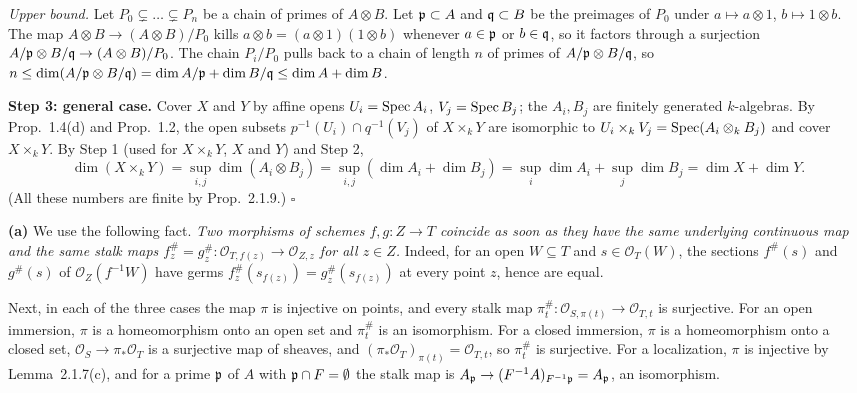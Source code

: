 \documentclass[11pt]{article}
\begin{document}
\emph{Upper bound.} Let $P_0\subsetneq\dots\subsetneq P_n$ be a chain of primes of $A\otimes B$. Let $\mathfrak p\subset A$ and $\mathfrak q\subset B$ be the preimages of $P_0$ under $a\mapsto a\otimes1$, $b\mapsto1\otimes b$. The map $A\otimes B\to(A\otimes B)/P_0$ kills $a\otimes b=(a\otimes1)(1\otimes b)$ whenever $a\in\mathfrak p$ or $b\in\mathfrak q$, so it factors through a surjection $A/\mathfrak p\otimes B/\mathfrak q\to(A\otimes B)/P_0$. The chain $P_i/P_0$ pulls back to a chain of length $n$ of primes of $A/\mathfrak p\otimes B/\mathfrak q$, so $n\le\dim(A/\mathfrak p\otimes B/\mathfrak q)=\dim A/\mathfrak p+\dim B/\mathfrak q\le\dim A+\dim B$.

\textbf{Step 3: general case.} Cover $X$ and $Y$ by affine opens $U_i=\operatorname{Spec} A_i$, $V_j=\operatorname{Spec} B_j$; the $A_i,B_j$ are finitely generated $k$-algebras. By Prop.~1.4(d) and Prop.~1.2, the open subsets $p^{-1}(U_i)\cap q^{-1}(V_j)$ of $X\times_kY$ are isomorphic to $U_i\times_kV_j=\operatorname{Spec}(A_i\otimes_kB_j)$ and cover $X\times_kY$. By Step 1 (used for $X\times_k Y$, $X$ and $Y$) and Step 2,
\[ \dim(X\times_kY)=\sup_{i,j}\dim(A_i\otimes B_j)=\sup_{i,j}(\dim A_i+\dim B_j)=\sup_i\dim A_i+\sup_j\dim B_j=\dim X+\dim Y. \]
(All these numbers are finite by Prop.~2.1.9.) \hfill$\square$

\pf
\textbf{(a)} We use the following fact. \emph{Two morphisms of schemes $f,g:Z\to T$ coincide as soon as they have the same underlying continuous map and the same stalk maps $f^\#_z=g^\#_z:\mathcal O_{T,f(z)}\to\mathcal O_{Z,z}$ for all $z\in Z$.} Indeed, for an open $W\subseteq T$ and $s\in\mathcal O_T(W)$, the sections $f^\#(s)$ and $g^\#(s)$ of $\mathcal O_Z(f^{-1}W)$ have germs $f^\#_z(s_{f(z)})=g^\#_z(s_{f(z)})$ at every point $z$, hence are equal.

Next, in each of the three cases the map $\pi$ is injective on points, and every stalk map $\pi^\#_t:\mathcal O_{S,\pi(t)}\to\mathcal O_{T,t}$ is surjective. For an open immersion, $\pi$ is a homeomorphism onto an open set and $\pi^\#_t$ is an isomorphism. For a closed immersion, $\pi$ is a homeomorphism onto a closed set, $\mathcal O_S\to\pi_*\mathcal O_T$ is a surjective map of sheaves, and $(\pi_*\mathcal O_T)_{\pi(t)}=\mathcal O_{T,t}$, so $\pi^\#_t$ is surjective. For a localization, $\pi$ is injective by Lemma~2.1.7(c), and for a prime $\mathfrak p$ of $A$ with $\mathfrak p\cap F=\emptyset$ the stalk map is $A_\mathfrak p\to(F^{-1}A)_{F^{-1}\mathfrak p}=A_\mathfrak p$, an isomorphism.
\end{document}
